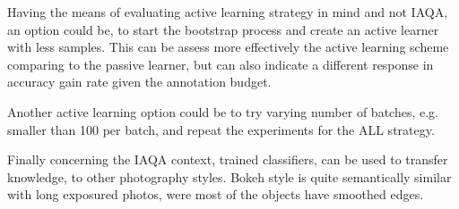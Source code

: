 Having the means of evaluating active learning strategy in mind and not IAQA, an option could be, to start the bootstrap process and create an active learner with less samples. This can be assess more effectively the active learning scheme comparing to the passive learner, but can also indicate a different response in accuracy gain rate given the annotation budget.

Another active learning option could be to try varying number of batches, e.g. smaller than 100 per batch, and repeat the experiments for the ALL strategy.

Finally concerning the IAQA context, trained classifiers, can be used to transfer knowledge, to other photography styles. Bokeh style is quite semantically similar with long exposured photos, were most of the objects have smoothed edges.
